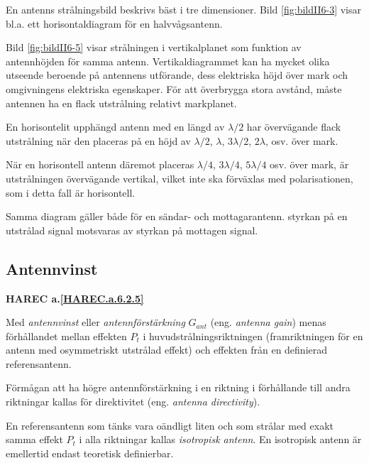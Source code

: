 En antenns strålningsbild beskrivs bäst i tre dimensioner.
Bild \ref{fig:bildII6-3} visar bl.a. ett horisontaldiagram för en
halvvågsantenn.

Bild \ref{fig:bildII6-5} visar strålningen i vertikalplanet som funktion av
antennhöjden för samma antenn.
Vertikaldiagrammet kan ha mycket olika utseende beroende på antennens utförande,
dess elektriska höjd över mark och omgivningens elektriska egenskaper.
För att överbrygga stora avstånd, måste antennen ha en flack utstrålning
relativt markplanet.

En horisontelit upphängd antenn med en längd av \(\lambda/2\) har övervägande
flack utstrålning när den placeras på en höjd av \(\lambda/2\), \(\lambda\),
\(3\lambda/2\), \(2\lambda\), osv. över mark.

När en horisontell antenn däremot placeras \(\lambda/4\), \(3\lambda/4\),
\(5\lambda/4\) osv. över mark, är utstrålningen övervägande vertikal, vilket
inte ska förväxlas med polarisationen, som i detta fall är horisontell.

Samma diagram gäller både för en sändar- och mottagarantenn. styrkan
på en utstrålad signal motsvaras av styrkan på mottagen signal.

\subsection{Antennvinst}
\textbf{
  HAREC a.\ref{HAREC.a.6.2.5}\label{myHAREC.a.6.2.5}
}

Med \emph{antennvinst} eller \emph{antennförstärkning} \(G_{ant}\) (eng.
\emph{antenna gain}) menas förhållandet mellan effekten \(P_t\) i
huvudstrålningsriktningen (framriktningen för en antenn med osymmetriskt
utstrålad effekt) och effekten från en definierad referensantenn.

Förmågan att ha högre antennförstärkning i en riktning i förhållande till andra
riktningar kallas för direktivitet (eng. \emph{antenna directivity}).

En referensantenn som tänks vara oändligt liten och som strålar med exakt
samma effekt \(P_t\) i alla riktningar kallas \emph{isotropisk antenn}.
En isotropisk antenn är emellertid endast teoretisk definierbar.

